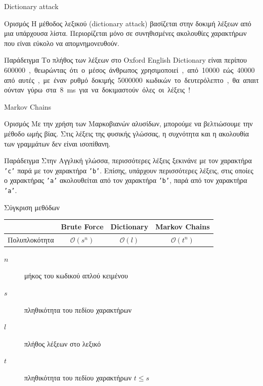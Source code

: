 \documentclass[10pt]{beamer}
\begin{document}
\begin{frame}{Dictionary attack}
    \begin{block}{Ορισμός}
        Η μέθοδος λεξικού (dictionary attack) βασίζεται στην δοκιμή λέξεων από μια υπάρχουσα λίστα. Περιορίζεται μόνο σε συνηθισμένες ακολουθίες χαρακτήρων που είναι εύκολο να απομνημονευθούν.
    \end{block}
    \pause
    \begin{block}{Παράδειγμα}
        Το πλήθος των λέξεων στο Oxford English Dictionary είναι περίπου \SI{600000}, θεωρώντας ότι ο μέσος άνθρωπος χρησιμοποιεί, από \SI{10000} εώς \SI{40000} από αυτές, με έναν ρυθμό δοκιμής \SI{5000000} κωδικών το δευτερόλεπτο, θα απαιτούνταν γύρω στα \SI{8}{ms} για να δοκιμαστούν όλες οι λέξεις!
    \end{block}
\end{frame}

\begin{frame}{Markov Chains}
    \begin{block}{Ορισμός}
        Με την χρήση των Μαρκοβιανών αλυσίδων, μπορούμε να βελτιώσουμε την μέθοδο ωμής βίας. Στις λέξεις της φυσικής γλώσσας, η συχνότητα και η ακολουθία των γραμμάτων δεν είναι ισοπίθανη.
    \end{block}
    \pause
    \begin{block}{Παράδειγμα}
        Στην Αγγλική γλώσσα, περισσότερες λέξεις ξεκινάνε με τον χαρακτήρα \texttt{'c'} παρά με τον χαρακτήρα \texttt{'b'}. Επίσης, υπάρχουν περισσότερες λέξεις, στις οποίες ο χαρακτήρας \texttt{'a'} ακολουθείται από τον χαρακτήρα \texttt{'b'}, παρά από τον χαρακτήρα \texttt{'a'}.
    \end{block}
\end{frame}

\begin{frame}{Σύγκριση μεθόδων}
    \begin{table}
        \begin{tabular}{l|c|c|c}
                        & Brute Force           & Dictionary            & Markov Chains \\\hline
        Πολυπλοκότητα   & $\mathcal{O}(s^n)$    & $\mathcal{O}(l)$      & $\mathcal{O}(t^n)$ \\
        \end{tabular}
    \end{table}

    \begin{description}
        \item[$n$] μήκος του κωδικού απλού κειμένου
        \item[$s$] πληθικότητα του πεδίου χαρακτήρων
        \item[$l$] πλήθος λέξεων στο λεξικό
        \item[$t$] πληθικότητα του πεδίου χαρακτήρων $t \le s$
    \end{description}
\end{frame}
\end{document}
